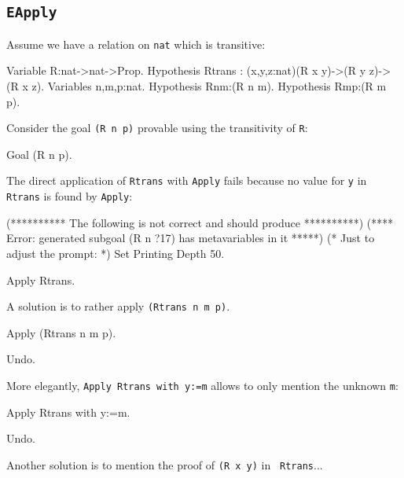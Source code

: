 \begin{coq_example*}
\section{\tt EApply}
\label{EApply-example}
\Example
Assume we have a relation on {\tt nat} which is transitive:

\begin{coq_example*}
Variable R:nat->nat->Prop.
Hypothesis Rtrans : (x,y,z:nat)(R x y)->(R y z)->(R x z).
Variables n,m,p:nat.
Hypothesis Rnm:(R n m).
Hypothesis Rmp:(R m p).
\end{coq_example*}

Consider the goal {\tt (R n p)} provable using the transitivity of
{\tt R}:

\begin{coq_example*}
Goal (R n p).
\end{coq_example*}

The direct application of {\tt Rtrans} with {\tt Apply} fails because
no value for {\tt y} in {\tt Rtrans} is found by {\tt Apply}:

\begin{coq_eval}
(********** The following is not correct and should produce **********)
(**** Error: generated subgoal (R n ?17) has metavariables in it *****)
(* Just to adjust the prompt: *) Set Printing Depth 50.
\end{coq_eval}
\begin{coq_example}
Apply Rtrans.
\end{coq_example}

A solution is to rather apply {\tt (Rtrans n m p)}.

\begin{coq_example}
Apply (Rtrans n m p).
\end{coq_example}

\begin{coq_eval}
  Undo.
\end{coq_eval}

More elegantly, {\tt Apply Rtrans with y:=m} allows to only mention
the unknown {\tt m}:

\begin{coq_example}
Apply Rtrans with y:=m.
\end{coq_example}

\begin{coq_eval}
  Undo.
\end{coq_eval}

Another solution is to mention the proof of {\tt (R x y)} in {\tt
Rtrans}...


\end{coq_example*}
